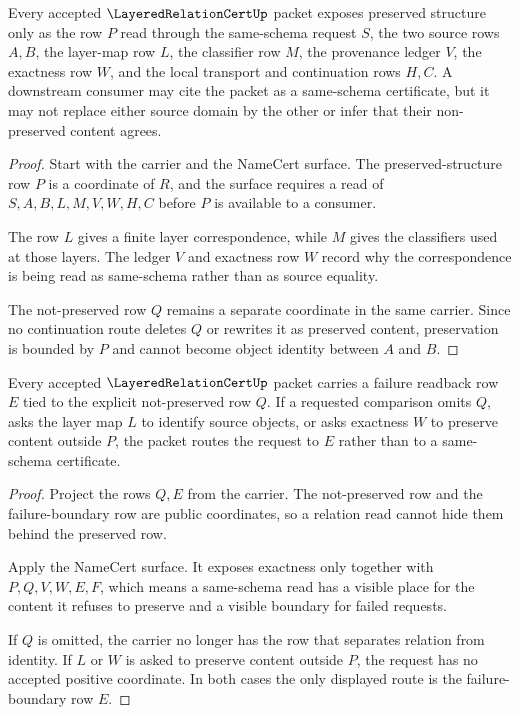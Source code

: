 \begin{theorem}
\label{thm:layered-relation-preservation-boundary}
Every accepted $\LayeredRelationCertUp$ packet exposes preserved structure only as the row $P$ read through the same-schema request $S$, the two source rows $A,B$, the layer-map row $L$, the classifier row $M$, the provenance ledger $V$, the exactness row $W$, and the local transport and continuation rows $H,C$. A downstream consumer may cite the packet as a same-schema certificate, but it may not replace either source domain by the other or infer that their non-preserved content agrees.
\end{theorem}
\begin{proof}
Start with the carrier and the NameCert surface. The preserved-structure row $P$ is a coordinate of $R$, and the surface requires a read of $S,A,B,L,M,V,W,H,C$ before $P$ is available to a consumer.

The row $L$ gives a finite layer correspondence, while $M$ gives the classifiers used at those layers. The ledger $V$ and exactness row $W$ record why the correspondence is being read as same-schema rather than as source equality.

The not-preserved row $Q$ remains a separate coordinate in the same carrier. Since no continuation route deletes $Q$ or rewrites it as preserved content, preservation is bounded by $P$ and cannot become object identity between $A$ and $B$.
\end{proof}

\begin{theorem}
\label{thm:layered-relation-failure-boundary}
Every accepted $\LayeredRelationCertUp$ packet carries a failure readback row $E$ tied to the explicit not-preserved row $Q$. If a requested comparison omits $Q$, asks the layer map $L$ to identify source objects, or asks exactness $W$ to preserve content outside $P$, the packet routes the request to $E$ rather than to a same-schema certificate.
\end{theorem}
\begin{proof}
Project the rows $Q,E$ from the carrier. The not-preserved row and the failure-boundary row are public coordinates, so a relation read cannot hide them behind the preserved row.

Apply the NameCert surface. It exposes exactness only together with $P,Q,V,W,E,F$, which means a same-schema read has a visible place for the content it refuses to preserve and a visible boundary for failed requests.

If $Q$ is omitted, the carrier no longer has the row that separates relation from identity. If $L$ or $W$ is asked to preserve content outside $P$, the request has no accepted positive coordinate. In both cases the only displayed route is the failure-boundary row $E$.
\end{proof}

